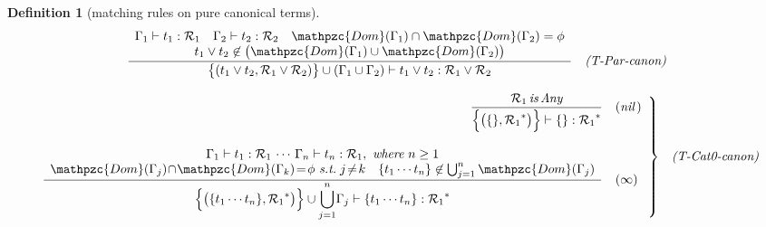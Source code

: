 \documentclass[12pt]{article}
\newtheorem{Definition}{Definition}[section]
\begin{document}
\begin{Definition}[matching rules on pure canonical terms]
\begin{displaymath}
\begin{array}{c}
\begin{array}{rl}
        \dfrac{
          \begin{array}{c}
            \Gamma_1 \vdash t_1 : \mathcal{R}_1
             \quad \Gamma_2 \vdash t_2 : \mathcal{R}_2
              \quad \mathpzc{Dom}(\Gamma_1) \cap \mathpzc{Dom}(\Gamma_2)
               = \phi  \\
            t_1 \vee t_2 \not\in \bigl(\mathpzc{Dom}(\Gamma_1) \cup
             \mathpzc{Dom}(\Gamma_2) \bigr)
          \end{array}
        }{
          \bigl\{(t_1 \vee t_2, \mathcal{R}_1 \vee \mathcal{R}_2) \bigr\}
           \cup (\Gamma_1 \cup \Gamma_2) \vdash
            t_1 \vee t_2 : \mathcal{R}_1 \vee \mathcal{R}_2
        }  &  \text{\it (T-Par-canon)}
      \end{array}  \\
      \\
      
      \begin{array}{rl}
        \left. \begin{array}{rl}
          \dfrac{
            \mathcal{R}_1\,\text{\it is}\, \text{\it Any}
          }{
            \Bigl\{\bigl(\{\}, {\mathcal{R}_1}^* \bigr) \Bigr\} \vdash
             \{\}: {\mathcal{R}_1}^*
          }  &  (\text{\it nil}\,)  \\
          \\
          \dfrac{
            \begin{array}{c}
              \Gamma_1 \vdash t_1 : \mathcal{R}_1 \,\cdots\,
               \Gamma_n \vdash t_n : \mathcal{R}_1,\
                \text{\it where}\ n \ge 1  \\
              \mathpzc{Dom}(\Gamma_j) \!\cap\! \mathpzc{Dom}(\Gamma_k) \!=\!
               \phi \ \text{\it s.t.}\; j \!\neq\! k
              \quad \{t_1 \cdots t_n \} \not\in
               \bigcup_{j=1}^{n}\mathpzc{Dom}(\Gamma_j)
            \end{array}
          }{
            \Bigl\{\bigl(\{t_1 \cdots t_n \}, {\mathcal{R}_1}^* \bigr)
             \Bigr\} \cup {\displaystyle \bigcup_{j = 1}^{n}} \Gamma_j
              \vdash \{t_1 \cdots t_n \} : {\mathcal{R}_1}^*
          }  &  (\infty)
        \end{array} \right\}  &  \text{\it (T-Cat0-canon)}
      \end{array}  \\
      \\
      

\end{array}
\end{displaymath}
\end{Definition}
\end{document}

